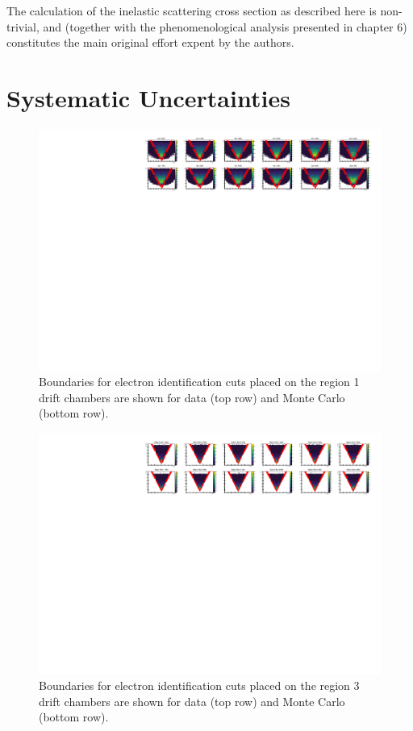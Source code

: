 The calculation of the inelastic scattering cross section as described here is non-trivial, and (together with the phenomenological analysis presented in chapter 6) constitutes the main original effort expent by the authors.    

\section{Systematic Uncertainties}

\begin{figure}
  \centering
  \label{fig:systematics-region1}
  \includegraphics[width=\textwidth]{image/plots/sidis/systematics/region1.pdf}
  \caption[Systematic boundaries on region 1]{Boundaries for electron identification cuts placed on the region 1 drift chambers are shown for data (top row) and Monte Carlo (bottom row).}
\end{figure}

\begin{figure}
  \centering
  \label{fig:systematics-region3}
  \includegraphics[width=\textwidth]{image/plots/sidis/systematics/region3.pdf}
  \caption[Systematic boundaries on region 3]{Boundaries for electron identification cuts placed on the region 3 drift chambers are shown for data (top row) and Monte Carlo (bottom row).}
\end{figure}

